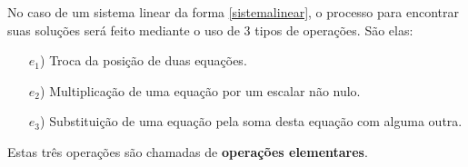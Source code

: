 \documentclass{beamer}
\begin{document}
    \begin{frame}
        No caso de um sistema linear da forma \eqref{sistemalinear}, \pause o processo para encontrar suas soluções ser\'a feito mediante o uso de 3 tipos de opera\c{c}\~oes. \pause S\~ao elas:\pause
        \begin{itemize}
	    \item[$e_1$)] Troca da posi\c{c}\~ao de duas equa\c{c}\~oes.\pause
	    \item[$e_2$)] Multiplica\c{c}\~ao de uma equa\c{c}\~ao por um escalar n\~ao nulo.\pause
	    \item[$e_3$)] Substitui\c{c}\~ao de uma equa\c{c}\~ao pela soma desta equa\c{c}\~ao com alguma outra.\pause
        \end{itemize}

        Estas tr\^es opera\c{c}\~oes s\~ao chamadas de \pause \textbf{opera\c{c}\~oes elementares}.
    \end{frame}
\end{document}
